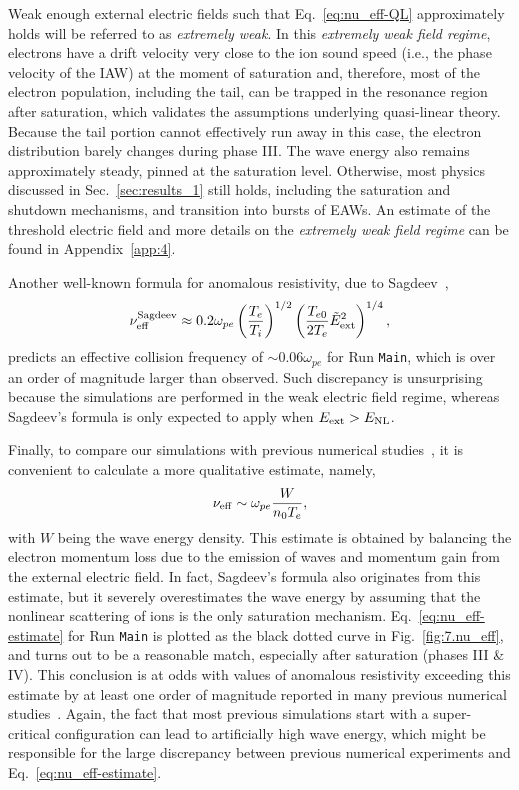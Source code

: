 \documentclass[%
 reprint,
 amsmath,
 amssymb,
 aps,
 prx,
floatfix,
superscriptaddress
]{revtex4-2}
\begin{document}
Weak enough external electric fields such that Eq.~\eqref{eq:nu_eff-QL} approximately holds will be referred to as {\it extremely weak}. 
In this {\it extremely weak field regime},  electrons have a drift velocity very close to the ion sound speed (i.e., the phase velocity of the IAW) at the moment of saturation and, therefore, most of the electron population, including the tail, can be trapped in the resonance region after saturation, which validates the assumptions underlying quasi-linear theory. 
Because the tail portion cannot effectively run away in this case, the electron distribution barely changes during phase III. 
The wave energy also remains approximately steady, pinned at the saturation level.
Otherwise, most physics discussed in Sec.~\ref{sec:results_1} still holds, including the saturation and shutdown mechanisms, and transition into bursts of EAWs.
An estimate of the threshold electric field and more details on the {\it extremely weak field regime} can be found in Appendix~\ref{app:4}.

Another well-known formula for anomalous resistivity, due to Sagdeev~\cite{Sagdeev1967, zavoiski1967turbulant},
\begin{align}
\label{eq:nu_eff-Sagdeev}
\nu_{\rm{eff}}^{\rm{Sagdeev}} \approx 0.2\omega_{pe}\left(\frac{T_e}{T_i}\right)^{1/2} \left( \frac{T_{e0}}{2T_e} \tilde{E}_{\rm{ext}}^2\right )^{1/4},
\end{align}
predicts an effective collision frequency of $\sim 0.06\omega_{pe}$ for Run {\tt Main}, which is over an order of magnitude larger than observed.
Such discrepancy is unsurprising because the simulations are performed in the weak electric field regime, whereas Sagdeev's formula is only expected to apply when $E_{\rm{ext}}>E_{\rm{NL}}$.

Finally, to compare our simulations with previous numerical studies~\citep{Labelle1988, watt2002ion, hellinger2004effective}, it is convenient to calculate a more qualitative estimate, namely, 
\begin{equation}
\label{eq:nu_eff-estimate}
    \nu_{\rm{eff}} \sim \omega_{pe} \frac{W}{n_0T_e},
\end{equation}
with $W$ being the wave energy density. 
This estimate is obtained by balancing the electron momentum loss due to the emission of waves and momentum gain from the external electric field. 
In fact, Sagdeev's formula also originates from this estimate, but it severely overestimates the wave energy by assuming that the nonlinear scattering of ions is the only saturation mechanism.
Eq.~\eqref{eq:nu_eff-estimate} for Run {\tt Main} is plotted as the black dotted curve in Fig.~\ref{fig:7.nu_eff}, and turns out to be a reasonable match, especially after saturation (phases III \& IV).
This conclusion is at odds with values of anomalous resistivity exceeding this estimate by at least one order of magnitude reported in many previous numerical studies~\citep[e.g.,][]{watt2002ion, hellinger2004effective, petkaki2003anomalous,petkaki2006anomalous}.
Again, the fact that most previous simulations start with a super-critical configuration can lead to artificially high wave energy, which might be responsible for the large discrepancy between previous numerical experiments and Eq.~\eqref{eq:nu_eff-estimate}. 
\end{document}
